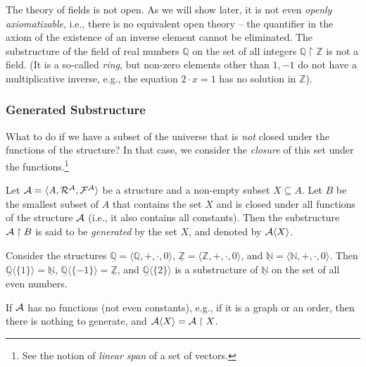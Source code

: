 \begin{example}
    The theory of fields is not open. As we will show later, it is not even \emph{openly axiomatizable}, i.e., there is no equivalent open theory -- the quantifier in the axiom of the existence of an inverse element cannot be eliminated. The substructure of the field of real numbers $\mathbb Q$ on the set of all integers $\mathbb Q\restriction\mathbb Z$ is not a field. (It is a so-called \emph{ring}, but non-zero elements other than $1,-1$ do not have a multiplicative inverse, e.g., the equation $2\cdot x=1$ has no solution in $\mathbb Z$).
\end{example}

\subsubsection{Generated Substructure}

What to do if we have a subset of the universe that is \emph{not} closed under the functions of the structure? In that case, we consider the \emph{closure} of this set under the functions.\footnote{See the notion of \emph{linear span} of a set of vectors.}

\begin{definition}
    Let $\mathcal{A}=\langle A,\mathcal R^\mathcal A,\mathcal F^\mathcal A\rangle$ be a structure and a non-empty subset $X\subseteq A$. Let $B$ be the smallest subset of $A$ that contains the set $X$ and is closed under all functions of the structure $\mathcal{A}$ (i.e., it also contains all constants). Then the substructure $\mathcal{A}\restriction B$ is said to be \emph{generated} by the set $X$, and denoted by $\mathcal{A}\langle X\rangle$.
\end{definition}

\begin{example}
    Consider the structures $\underline{\mathbb Q}=\langle\mathbb Q,+,\cdot,0\rangle$, $\underline{\mathbb Z}=\langle\mathbb Z,+,\cdot,0\rangle$, and $\underline{\mathbb N}=\langle\mathbb N,+,\cdot,0\rangle$. Then $\underline{\mathbb Q}\langle\{1\}\rangle=\underline{\mathbb N}$, $\underline{\mathbb Q}\langle\{-1\}\rangle=\underline{\mathbb Z}$, and $\underline{\mathbb Q}\langle\{2\}\rangle$ is a substructure of $\underline{\mathbb N}$ on the set of all even numbers.
\end{example}

\begin{example}
    If $\mathcal{A}$ has no functions (not even constants), e.g., if it is a graph or an order, then there is nothing to generate, and $\mathcal{A}\langle X\rangle=\mathcal{A}\restriction X$.
\end{example}

